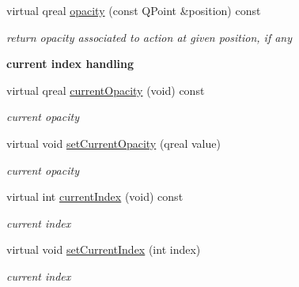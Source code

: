 \begin{DoxyCompactItemize}
\mbox{\label{class_tab_bar_data_aa8623741bcdc6b3466fa01ef079db914}} 
virtual qreal \hyperlink{class_tab_bar_data_aa8623741bcdc6b3466fa01ef079db914}{opacity} (const Q\+Point \&position) const
\begin{DoxyCompactList}\small\item\em return opacity associated to action at given position, if any \end{DoxyCompactList}\end{DoxyCompactItemize}
\begin{Indent}\textbf{ current index handling}\par
\begin{DoxyCompactItemize}
\item 
\mbox{\label{class_tab_bar_data_a1a7b164f2824a01602dc4be6634074c5}} 
virtual qreal \hyperlink{class_tab_bar_data_a1a7b164f2824a01602dc4be6634074c5}{current\+Opacity} (void) const
\begin{DoxyCompactList}\small\item\em current opacity \end{DoxyCompactList}\item 
\mbox{\label{class_tab_bar_data_adac8a441c067f06266d76ecfd6087e75}} 
virtual void \hyperlink{class_tab_bar_data_adac8a441c067f06266d76ecfd6087e75}{set\+Current\+Opacity} (qreal value)
\begin{DoxyCompactList}\small\item\em current opacity \end{DoxyCompactList}\item 
\mbox{\label{class_tab_bar_data_a7ff5a9bf4007902a4c9cd386abf71f10}} 
virtual int \hyperlink{class_tab_bar_data_a7ff5a9bf4007902a4c9cd386abf71f10}{current\+Index} (void) const
\begin{DoxyCompactList}\small\item\em current index \end{DoxyCompactList}\item 
\mbox{\label{class_tab_bar_data_ab02e6ba64c7aa07a03f3091579e7db9c}} 
virtual void \hyperlink{class_tab_bar_data_ab02e6ba64c7aa07a03f3091579e7db9c}{set\+Current\+Index} (int index)
\begin{DoxyCompactList}\small\item\em current index \end{DoxyCompactList}\item 

\end{DoxyCompactItemize}
\end{Indent}
